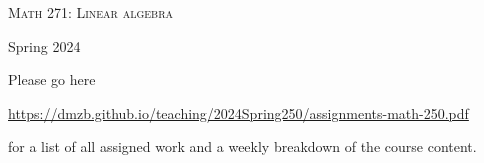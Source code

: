 \documentclass[12pt]{article}
\begin{document}
\begin{center}
{\Large \textsc{Math 271: Linear algebra}}
\end{center}
\begin{center}
Spring 2024
\end{center}



\noindent Please go here 
\begin{center}
 \url{https://dmzb.github.io/teaching/2024Spring250/assignments-math-250.pdf}
\end{center}
for a list of all assigned work and a weekly breakdown of the course content.
\end{document}
